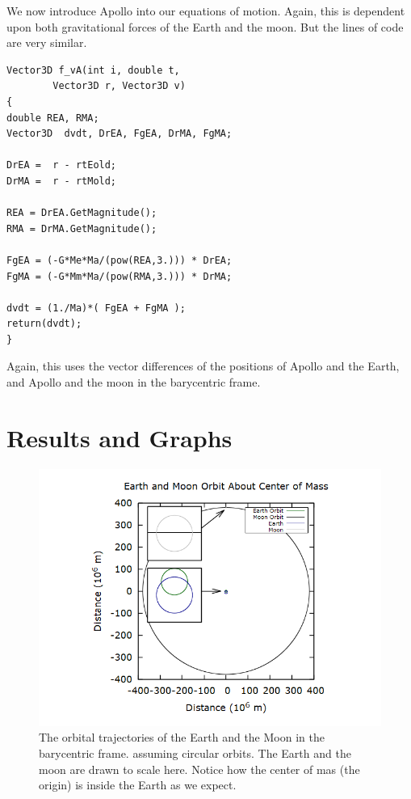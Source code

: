 \documentclass[aps,prl,twocolumn,superscriptaddress]{revtex4-1}
\begin{document}
We now introduce Apollo into our equations of motion. Again, this is dependent upon both gravitational forces of the Earth and the moon. But the lines of code are very similar.

\begin{lstlisting}
Vector3D f_vA(int i, double t, 
		Vector3D r, Vector3D v)
{
double REA, RMA;
Vector3D  dvdt, DrEA, FgEA, DrMA, FgMA;

DrEA =  r - rtEold;
DrMA =  r - rtMold;

REA = DrEA.GetMagnitude();
RMA = DrMA.GetMagnitude();

FgEA = (-G*Me*Ma/(pow(REA,3.))) * DrEA;
FgMA = (-G*Mm*Ma/(pow(RMA,3.))) * DrMA;

dvdt = (1./Ma)*( FgEA + FgMA );
return(dvdt);
}
\end{lstlisting}
Again, this uses the vector differences of the positions of Apollo and the Earth, and Apollo and the moon in the barycentric frame.

\section{Results and Graphs}

\begin{figure}[htbp]
  	\begin{center}
 		\includegraphics[scale=0.3]{em.png}
  		\caption{The orbital trajectories of the Earth and the Moon in the barycentric frame. assuming circular orbits. The Earth and the moon are drawn to scale here. Notice how the center of mas (the origin) is inside the Earth as we expect.}
  		\label{gr:earthmoon}
 	\end{center}
\end{figure}
\end{document}

